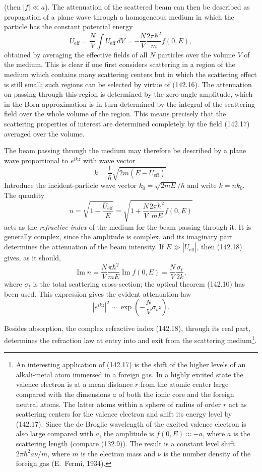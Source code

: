 (then $|f|\ll a$). The attenuation of the scattered beam can then be
described as propagation of a plane wave through a homogeneous medium in
which the particle has the constant potential energy
\begin{equation}
 \overline{U}_{\mathrm{eff}}=\frac NV\int U_{\mathrm{eff}}\,dV
 =-\frac NV\frac{2\pi\hbar^2}{m}f(0,E),
 \tag{142.17}
\end{equation}
obtained by averaging the effective fields of all $N$ particles over the
volume $V$ of the medium. This is clear if one first considers scattering in
a region of the medium which contains many scattering centers but in which
the scattering effect is still small; such regions can be selected by virtue
of (142.16). The attenuation on passing through this region is determined by
the zero-angle amplitude, which in the Born approximation is in turn
determined by the integral of the scattering field over the whole volume of
the region. This means precisely that the scattering properties of interest
are determined completely by the field (142.17) averaged over the volume.

The beam passing through the medium may therefore be described by a plane
wave proportional to $e^{ikz}$ with wave vector
\[
 k=\frac1\hbar\sqrt{2m(E-\overline{U}_{\mathrm{eff}})}.
\]
Introduce the incident-particle wave vector $k_0=\sqrt{2mE}/\hbar$ and write
$k=nk_0$. The quantity
\begin{equation}
 n=\sqrt{1-\frac{\overline{U}_{\mathrm{eff}}}{E}}
 =\sqrt{1+\frac NV\frac{2\pi\hbar^2}{mE}f(0,E)}
 \tag{142.18}
\end{equation}
acts as the \emph{refractive index} of the medium for the beam passing through
it. It is generally complex, since the amplitude is complex, and its imaginary
part determines the attenuation of the beam intensity. If
$E\gg|\overline{U}_{\mathrm{eff}}|$, then (142.18) gives, as it should,
\[
 \operatorname{Im}n=\frac NV\frac{\pi\hbar^2}{mE}\operatorname{Im}f(0,E)
 =\frac NV\frac{\sigma_t}{2k},
\]
where $\sigma_t$ is the total scattering cross-section; the optical theorem
(142.10) has been used. This expression gives the evident attenuation law
\[
 |e^{ikz}|^2\sim\exp\left(-\frac NV\sigma_tz\right).
\]

Besides absorption, the complex refractive index (142.18), through its real
part, determines the refraction law at entry into and exit from the scattering
medium\footnote{An interesting application of (142.17) is the shift of the
higher levels of an alkali-metal atom immersed in a foreign gas. In a highly
excited state the valence electron is at a mean distance $r$ from the atomic
center large compared with the dimensions $a$ of both the ionic core and the
foreign neutral atoms. The latter atoms within a sphere of radius of order
$r$ act as scattering centers for the valence electron and shift its energy
level by (142.17). Since the de Broglie wavelength of the excited valence
electron is also large compared with $a$, the amplitude is
$f(0,E)\approx-a$, where $a$ is the scattering length (compare (132.9)). The
result is a constant level shift $2\pi\hbar^2a\nu/m$, where $m$ is the
electron mass and $\nu$ is the number density of the foreign gas
(E.~Fermi, 1934).}.

